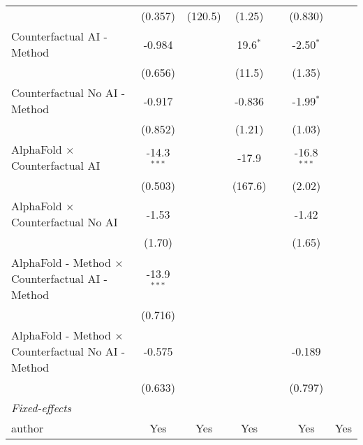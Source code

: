 \begin{tabular}{lcccccc}
                                                              & (0.357)       & (120.5)      & (1.25)       &      & (0.830)       &   \\   
   Counterfactual AI - Method                                 & -0.984        &              & 19.6$^{*}$   &      & -2.50$^{*}$   &   \\   
                                                              & (0.656)       &              & (11.5)       &      & (1.35)        &   \\   
   Counterfactual No AI - Method                              & -0.917        &              & -0.836       &      & -1.99$^{*}$   &   \\   
                                                              & (0.852)       &              & (1.21)       &      & (1.03)        &   \\   
   AlphaFold $\times$ Counterfactual AI                       & -14.3$^{***}$ &              & -17.9        &      & -16.8$^{***}$ &   \\   
                                                              & (0.503)       &              & (167.6)      &      & (2.02)        &   \\   
   AlphaFold $\times$ Counterfactual No AI                    & -1.53         &              &              &      & -1.42         &   \\   
                                                              & (1.70)        &              &              &      & (1.65)        &   \\   
   AlphaFold - Method $\times$ Counterfactual AI - Method     & -13.9$^{***}$ &              &              &      &               &   \\   
                                                              & (0.716)       &              &              &      &               &   \\   
   AlphaFold - Method $\times$ Counterfactual No AI - Method  & -0.575        &              &              &      & -0.189        &   \\   
                                                              & (0.633)       &              &              &      & (0.797)       &   \\   
   \midrule
   \emph{Fixed-effects}\\
   author                                                     & Yes           & Yes          & Yes          &      & Yes           & Yes\\  

\end{tabular}
